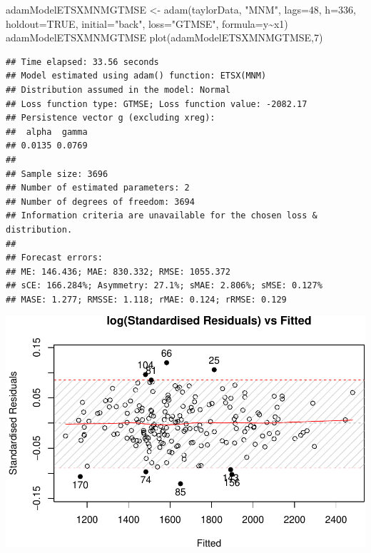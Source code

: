 \documentclass[
]{book}
\newenvironment{Shaded}{\begin{snugshade}}{\end{snugshade}}
\newcommand{\AttributeTok}[1]{\textcolor[rgb]{0.77,0.63,0.00}{#1}}
\newcommand{\ConstantTok}[1]{\textcolor[rgb]{0.00,0.00,0.00}{#1}}
\newcommand{\DecValTok}[1]{\textcolor[rgb]{0.00,0.00,0.81}{#1}}
\newcommand{\FunctionTok}[1]{\textcolor[rgb]{0.00,0.00,0.00}{#1}}
\newcommand{\NormalTok}[1]{#1}
\newcommand{\OtherTok}[1]{\textcolor[rgb]{0.56,0.35,0.01}{#1}}
\newcommand{\SpecialCharTok}[1]{\textcolor[rgb]{0.00,0.00,0.00}{#1}}
\newcommand{\StringTok}[1]{\textcolor[rgb]{0.31,0.60,0.02}{#1}}
\theoremstyle{definition}
\theoremstyle{definition}
\theoremstyle{definition}
\theoremstyle{definition}
\theoremstyle{remark}
\begin{document}
\begin{Shaded}
\begin{Highlighting}[]
\NormalTok{adamModelETSXMNMGTMSE }\OtherTok{\textless{}{-}} \FunctionTok{adam}\NormalTok{(taylorData, }\StringTok{"MNM"}\NormalTok{, }\AttributeTok{lags=}\DecValTok{48}\NormalTok{,}
                              \AttributeTok{h=}\DecValTok{336}\NormalTok{, }\AttributeTok{holdout=}\ConstantTok{TRUE}\NormalTok{,}
                              \AttributeTok{initial=}\StringTok{"back"}\NormalTok{, }\AttributeTok{loss=}\StringTok{"GTMSE"}\NormalTok{,}
                              \AttributeTok{formula=}\NormalTok{y}\SpecialCharTok{\textasciitilde{}}\NormalTok{x1)}
\NormalTok{adamModelETSXMNMGTMSE}
\FunctionTok{plot}\NormalTok{(adamModelETSXMNMGTMSE,}\DecValTok{7}\NormalTok{)}
\end{Highlighting}
\end{Shaded}

\begin{verbatim}
## Time elapsed: 33.56 seconds
## Model estimated using adam() function: ETSX(MNM)
## Distribution assumed in the model: Normal
## Loss function type: GTMSE; Loss function value: -2082.17
## Persistence vector g (excluding xreg):
##  alpha  gamma 
## 0.0135 0.0769 
## 
## Sample size: 3696
## Number of estimated parameters: 2
## Number of degrees of freedom: 3694
## Information criteria are unavailable for the chosen loss & distribution.
## 
## Forecast errors:
## ME: 146.436; MAE: 830.332; RMSE: 1055.372
## sCE: 166.284%; Asymmetry: 27.1%; sMAE: 2.806%; sMSE: 0.127%
## MASE: 1.277; RMSSE: 1.118; rMAE: 0.124; rRMSE: 0.129
\end{verbatim}

\includegraphics{adam_files/figure-latex/unnamed-chunk-110-1.pdf}
\end{document}
